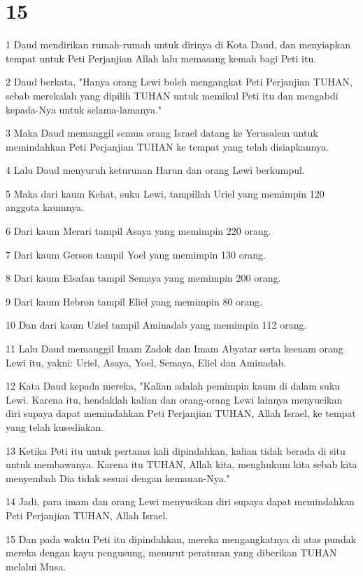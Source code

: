 \chapter{15}

\par 1 Daud mendirikan rumah-rumah untuk dirinya di Kota Daud, dan menyiapkan tempat untuk Peti Perjanjian Allah lalu memasang kemah bagi Peti itu.
\par 2 Daud berkata, "Hanya orang Lewi boleh mengangkat Peti Perjanjian TUHAN, sebab merekalah yang dipilih TUHAN untuk memikul Peti itu dan mengabdi kepada-Nya untuk selama-lamanya."
\par 3 Maka Daud memanggil semua orang Israel datang ke Yerusalem untuk memindahkan Peti Perjanjian TUHAN ke tempat yang telah disiapkannya.
\par 4 Lalu Daud menyuruh keturunan Harun dan orang Lewi berkumpul.
\par 5 Maka dari kaum Kehat, suku Lewi, tampillah Uriel yang memimpin 120 anggota kaumnya.
\par 6 Dari kaum Merari tampil Asaya yang memimpin 220 orang.
\par 7 Dari kaum Gerson tampil Yoel yang memimpin 130 orang.
\par 8 Dari kaum Elsafan tampil Semaya yang memimpin 200 orang.
\par 9 Dari kaum Hebron tampil Eliel yang memimpin 80 orang.
\par 10 Dan dari kaum Uziel tampil Aminadab yang memimpin 112 orang.
\par 11 Lalu Daud memanggil Imam Zadok dan Imam Abyatar serta keenam orang Lewi itu, yakni: Uriel, Asaya, Yoel, Semaya, Eliel dan Aminadab.
\par 12 Kata Daud kepada mereka, "Kalian adalah pemimpin kaum di dalam suku Lewi. Karena itu, hendaklah kalian dan orang-orang Lewi lainnya menyucikan diri supaya dapat memindahkan Peti Perjanjian TUHAN, Allah Israel, ke tempat yang telah kusediakan.
\par 13 Ketika Peti itu untuk pertama kali dipindahkan, kalian tidak berada di situ untuk membawanya. Karena itu TUHAN, Allah kita, menghukum kita sebab kita menyembah Dia tidak sesuai dengan kemauan-Nya."
\par 14 Jadi, para imam dan orang Lewi menyucikan diri supaya dapat memindahkan Peti Perjanjian TUHAN, Allah Israel.
\par 15 Dan pada waktu Peti itu dipindahkan, mereka mengangkatnya di atas pundak mereka dengan kayu pengusung, menurut peraturan yang diberikan TUHAN melalui Musa.
